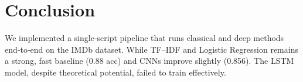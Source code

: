 \documentclass[12pt,a4paper]{article}
\begin{document}
\section{Conclusion}
We implemented a single‐script pipeline that runs classical and deep methods end‐to‐end on the IMDb dataset. While TF–IDF and Logistic Regression remains a strong, fast baseline (0.88 acc) and CNNs improve slightly (0.856). The LSTM model, despite theoretical potential, failed to train effectively.
\end{document}
